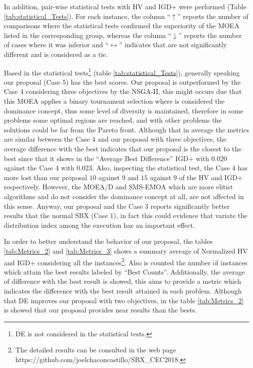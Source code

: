 In addition, pair-wise statistical tests with HV and IGD+ were performed (Table \ref{tab:statistical_Tests}).
%
For each instance, the column ``$\uparrow$'' reports the number of comparisons where the statistical tests confirmed the superiority of the MOEA listed in the corresponding group, whereas the column ``$\downarrow$'' reports the number of cases where it was inferior and ``$\longleftrightarrow$'' indicates that are not significantly different and is considered as a tie.


Based in the statistical tests\footnote{DE is not considered in the statistical tests.} (table \ref{tab:statistical_Tests}), generally speaking our proposal (Case 5) has the best scores.
%
Our proposal is outperformed by the Case 4 considering three objectives by the NSGA-II, this might occurs due that this MOEA applies a binary tournament selection where is considered the dominance concept, thus some level of diversity is maintained, therefore in some problems some optimal regions are reached, and with other problems the solutions could be far from the Pareto front.
%
Although that in average the metrics are similar between the Case 4 and our proposal with three objectives, the average difference with the best indicates that our proposal is the closest to the best since that it shows in the ``Average Best Difference'' IGD+ with $0.020$ against the Case 4 with $0.023$.
%
Also, inspecting the statistical test, the Case 4 has more lost than our proposal $10$ against $9$ and $15$ against $9$ of the HV and IGD+ respectively.
%
However, the MOEA/D and SMS-EMOA which are more elitist algorithms and do not consider the dominance concept at all, are not affected in this sense.
%
Anyway, our proposal and the Case 3 reports significantly better results that the normal SBX (Case 1), in fact this could evidence that variate the distribution index among the execution has an important effect.


In order to better understand the behavior of our proposal, the tables \ref{tab:Metrics_2} and \ref{tab:Metrics_3} shows a summary average of Normalized HV and IGD+ considering all the instances\footnote{The detailed results can be consulted in the web page https:\//\//github.com\//joelchaconcastillo\//SBX\_CEC2018.}.
%
Also is counted the number of instances which attain the best results labeled by ``Best Counts''.
%
Additionally, the average of difference with the best result is showed, this aims to provide a metric which indicates the difference with the best result attained in each problem.
%
Although that DE improves our proposal with two objectives, in the table \ref{tab:Metrics_2}  is showed that our proposal provides near results than the bests.
%

